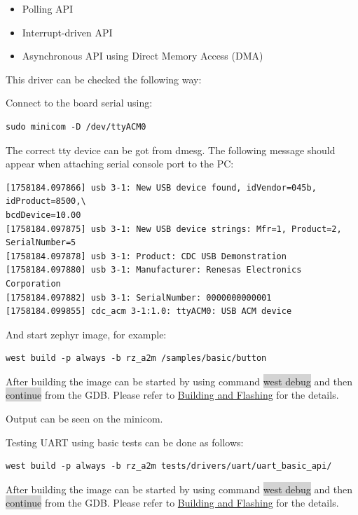 \documentclass[11pt,a4paper,oneside]{article}
\begin{document}
\begin{itemize}
\item
  Polling API
\item
  Interrupt-driven API
\item
  Asynchronous API using Direct Memory Access (DMA)
\end{itemize}

This driver can be checked the following way:

Connect to the board serial using:

\begin{lstlisting}
sudo minicom -D /dev/ttyACM0
\end{lstlisting}

The correct tty device can be got from dmesg. The following message
should appear when attaching serial console port to the PC:

\begin{lstlisting}
[1758184.097866] usb 3-1: New USB device found, idVendor=045b, idProduct=8500,\
bcdDevice=10.00
[1758184.097875] usb 3-1: New USB device strings: Mfr=1, Product=2, SerialNumber=5
[1758184.097878] usb 3-1: Product: CDC USB Demonstration
[1758184.097880] usb 3-1: Manufacturer: Renesas Electronics Corporation
[1758184.097882] usb 3-1: SerialNumber: 0000000000001
[1758184.099855] cdc_acm 3-1:1.0: ttyACM0: USB ACM device
\end{lstlisting}

And start zephyr image, for example:

\begin{lstlisting}
west build -p always -b rz_a2m /samples/basic/button
\end{lstlisting}

After building the image can be started by using command \colorbox{lightgray}{west debug}
and then \colorbox{lightgray}{continue} from the GDB. Please refer to
\hyperref[building-and-flashing]{Building and Flashing} for the
details.

Output can be seen on the minicom.

Testing UART using basic tests can be done as follows:

\begin{lstlisting}
west build -p always -b rz_a2m tests/drivers/uart/uart_basic_api/
\end{lstlisting}

After building the image can be started by using command \colorbox{lightgray}{west debug}
and then \colorbox{lightgray}{continue} from the GDB. Please refer to
\hyperref[building-and-flashing]{Building and Flashing} for the
details.
\end{document}
